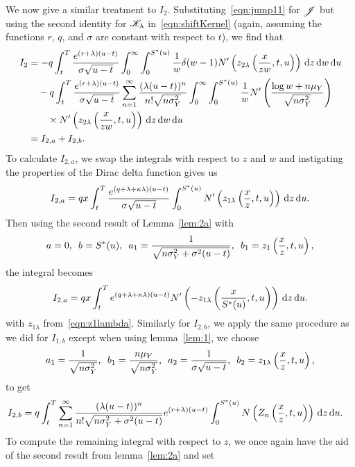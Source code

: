 		We now give a similar treatment to $I_2$. Substituting~\eqref{eqn:jump11} for $\mathscr J$ but using the second identity for $\mathscr K_\lambda$ in~\eqref{eqn:shiftKernel} (again, assuming the functions $r$, $q$, and $\sigma$ are constant with respect to $t$), we find that
		\begin{align*}
        			I_2 &= -q\int_t^T \frac{e^{(r+\lambda)(u-t)}}{\sigma\sqrt{u-t}} \int_0^\infty\int_0^{S^*(u)} \frac{1}{w} \delta(w-1) N'\left( z_{2\lambda}\left( \frac{x}{zw}, t, u \right) \right) \, \mathrm d z \, \mathrm d w \, \mathrm d u \\
        			& {}\quad -q\int_t^T \frac{e^{(r+\lambda)(u-t)}}{\sigma\sqrt{u-t}} \displaystyle\sum\limits_{n=1}^{\infty} \frac{(\lambda(u-t))^n}{n!\sqrt{n\sigma_Y^2}}\int_0^\infty \int_0^{S^*(u)} \frac{1}{w}N'\left( \frac{\log w + n\mu_Y}{\sqrt{n\sigma_Y^2}} \right) \\
        			& {} \quad \quad \times N'\left( z_{2\lambda}\left( \frac{x}{zw}, t, u \right) \right) \, \mathrm d z \, \mathrm d w \, \mathrm d u \\
        			&= I_{2,a} + I_{2,b}.
        		\end{align*}
		To calculate $I_{2,a}$, we swap the integrals with respect to $z$ and $w$ and instigating the properties of the Dirac delta function gives us
			$$
				I_{2,a} = qx\int_t^T \frac{e^{(q+\lambda+\kappa\lambda)(u-t)}}{\sigma\sqrt{u-t}}\int_0^{S^*(u)} N'\left( z_{1\lambda}\left( \frac{x}{z}, t, u \right) \right) \, \mathrm d z \, \mathrm d u.
			$$
		Then using the second result of Lemma~\ref{lem:2a} with
			$$
				a = 0, \enskip b = S^*(u), \enskip a_1 = \frac{1}{\sqrt{n\sigma_Y^2 + \sigma^2(u-t)}}, \enskip
			b_1 = z_1\left( \frac{x}{z}, t, u \right),
			$$
		the integral becomes
			$$
				I_{2,a} = qx\int_t^T e^{(q+\lambda+\kappa\lambda)(u-t)} N'\left(-z_{1\lambda}\left( \frac{x}{S^*(u)}, t, u \right) \right) \, \mathrm d z \, \mathrm d u.
			$$
		with $z_{1\lambda}$ from~\eqref{eqn:z1lambda}. Similarly for $I_{2,b}$, we apply the same procedure as we did for $I_{1,b}$ except when using lemma~\ref{lem:1}, we choose
			$$
        			a_1 = \frac{1}{\sqrt{n\sigma_Y^2}}, \enskip b_1 = \frac{n\mu_Y}{\sqrt{n\sigma_Y^2}}, \enskip
        			a_2 = \frac{1}{\sigma\sqrt{u-t}}, \enskip b_2 = z_{1\lambda}\left( \frac{x}{z}, t, u\right),
        		$$
	to get
			\begin{align*}
				I_{2,b} &= q  \int_t^T  \displaystyle\sum\limits_{n=1}^{\infty} \frac{(\lambda(u-t))^n}{n!\sqrt{n\sigma_Y^2 + \sigma^2(u-t)}}  e^{(r+\lambda)(u-t)} \int_0^{S^*(u)} N\left( Z_n \left( \frac{x}{z},t,u  \right) \right) \,\mathrm d z \, \mathrm d u.
			\end{align*}
	To compute the remaining integral with respect to $z$, we once again have the aid of the second result from lemma~\ref{lem:2a} and set
